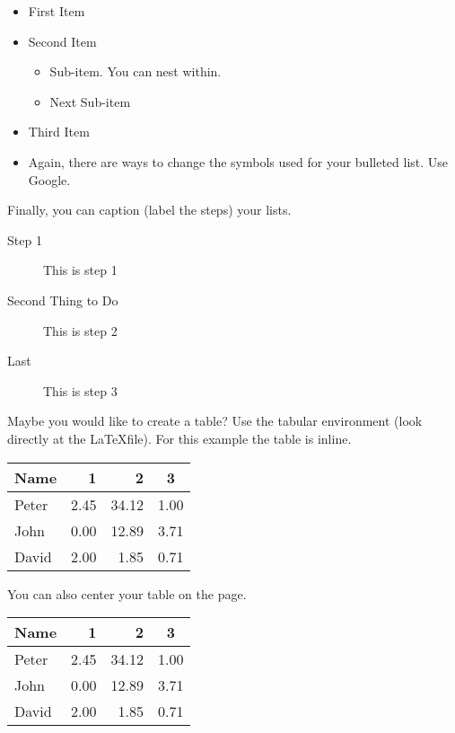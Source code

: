 \documentclass[12pt]{article}
\theoremstyle{definition}
\begin{document}
\begin{itemize} %

\item First Item
\item Second Item
           \begin{itemize}
		\item Sub-item. You can nest within.
		\item Next Sub-item \eighthnote \uranus %
	\end{itemize}
	
\item Third Item
		
\item Again, there are ways to change the symbols used for your bulleted list. Use Google.

\end{itemize}
Finally, you can caption (label the steps) your lists.
\begin{description} %
\item[Step 1] This is step 1 %
\item[Second Thing to Do] This is step 2
\item[Last] This is step 3
\end{description}

Maybe you would like to create a table?  Use the tabular environment (look directly at the \LaTeX \thinspace file). For this example the table is inline.
\begin{tabular}{| l | r | r | c |}
\hline
Name &1 &2 &3 \\ \hline
Peter & 2.45 & 34.12 & 1.00 \\ \hline
John & 0.00 & 12.89 & 3.71 \\ \hline
David & 2.00 & 1.85 & 0.71 \\ \hline
\end{tabular}
You can also center your table on the page.
\begin{center}
\begin{tabular}{| l | r | r | c |}
\hline
Name &1 &2 &3 \\ \hline
Peter & 2.45 & 34.12 & 1.00 \\ \hline
John & 0.00 & 12.89 & 3.71 \\ \hline
David & 2.00 & 1.85 & 0.71 \\ \hline
\end{tabular}
\end{center}
\end{document}
